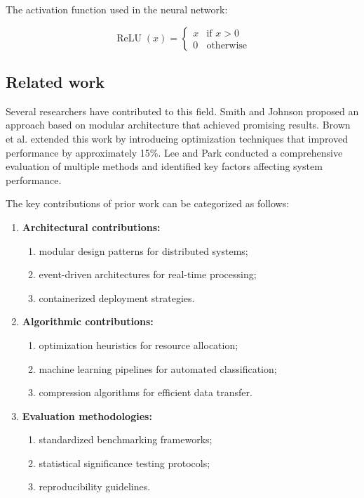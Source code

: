 The activation function used in the neural network:

\begin{equation} \label{eq:relu}
    \operatorname{ReLU}(x) =
    \begin{cases}
        x & \text{if } x > 0 \\
        0 & \text{otherwise}
    \end{cases}
\end{equation}

\subsection{Related work}

Several researchers have contributed to this field.
Smith and Johnson \cite{sample-ref} proposed an approach based on modular architecture that achieved promising results.
Brown et al. \cite{sample-analysis} extended this work by introducing optimization techniques that improved performance by approximately 15\%.
Lee and Park \cite{sample-testing} conducted a comprehensive evaluation of multiple methods and identified key factors affecting system performance.

The key contributions of prior work can be categorized as follows:
\begin{enumerate}
    \item \textbf{Architectural contributions:}
          \begin{enumerate}
              \item modular design patterns for distributed systems;
              \item event-driven architectures for real-time processing;
              \item containerized deployment strategies.
          \end{enumerate}
    \item \textbf{Algorithmic contributions:}
          \begin{enumerate}
              \item optimization heuristics for resource allocation;
              \item machine learning pipelines for automated classification;
              \item compression algorithms for efficient data transfer.
          \end{enumerate}
    \item \textbf{Evaluation methodologies:}
          \begin{enumerate}
              \item standardized benchmarking frameworks;
              \item statistical significance testing protocols;
              \item reproducibility guidelines.
          \end{enumerate}
\end{enumerate}

